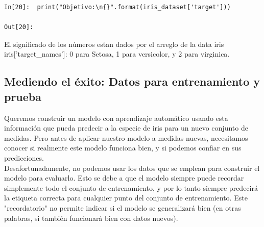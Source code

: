 \begin{lstlisting}
In[20]:  print("Objetivo:\n{}".format(iris_dataset['target']))

Out[20]:
\end{lstlisting}
{ }


El significado de los números estan dados por el arreglo   de la data iris 
 {\ttfamily iris['target\_names']}:  0 para Setosa, 1 para versicolor, y 2 para virginica.



  
\subsection{Mediendo el éxito: Datos para entrenamiento y prueba}

Queremos  construir un modelo con aprendizaje automático usando esta información que pueda predecir a la especie de iris para un nuevo conjunto de medidas. Pero antes de aplicar nuestro modelo a medidas nuevas, necesitamos conocer si realmente este modelo funciona bien, y si podemos confiar en sus predicciones. \\


Desafortunadamente, no podemos usar los datos que se emplean para construir el modelo para evaluarlo. Esto se debe a que el modelo siempre puede recordar simplemente todo el conjunto de entrenamiento, y por lo tanto siempre predecirá la etiqueta correcta para cualquier punto del conjunto de entrenamiento. Este
"{}recordatorio"{} no permite  indicar si el modelo se generalizará bien (en  otras palabras, si también funcionará bien con datos nuevos).


